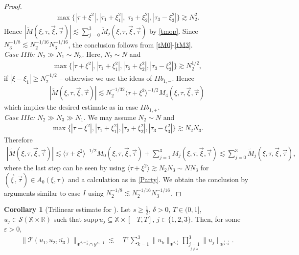 \documentclass[reqno]{amsart}
\theoremstyle{Definitionl}
\theoremstyle{Definitionk}
\theoremstyle{definition}
\theoremstyle{Satzk}
\theoremstyle{Satzl}
\newtheorem{korl}[defi]{Corollary}
\theoremstyle{Bemerkung}
\begin{document}
\begin{proof}
\begin{align*}
\max\{|\tau+\xi^2|,|\tau_1+\xi_1^2|,|\tau_2+\xi_2^2|,|\tau_3-\xi_3^2|\}\gtrsim N_2^2.
\end{align*}
Hence $|\tilde M(\xi,\tau,\vec\xi,\vec\tau)|\lesssim \sum_{j=0}^3\tilde M_j(\xi,\tau,\vec\xi,\vec\tau)$ by \eqref{tmop}. Since $N_3^{-1/8}\lesssim N_2^{-1/16}N_3^{-1/16}$, the conclusion follows from \eqref{tM0}-\eqref{tM3}.\\[10pt]
\emph{Case $IIIb$: $N_2\gg N_1\sim N_3$. }Here, $N_2\sim N$ and 
\begin{align*}
\max\{|\tau+\xi^2|,|\tau_1+\xi_1^2|,|\tau_2+\xi_2^2|,|\tau_3-\xi_3^2|\}\gtrsim N_2^{1/2},
\end{align*}
if $|\xi-\xi_1|\ge N_2^{-1/2}$ -- otherwise we use the ideas of $IIb_{1,-}$. Hence
\begin{align*}
|\tilde M(\xi,\tau,\vec\xi,\vec\tau)|\lesssim N_2^{-1/32}\langle\tau+\xi^2\rangle^{-1/2}M_4(\xi,\tau,\vec\xi,\vec\tau)
\end{align*}
which implies the desired estimate as in case $IIb_{1,+}$.\\[10pt]
\emph{Case $IIIc$: $N_2\gg N_3\gg N_1$. }We may assume $N_2\sim N$ and 
\begin{align*}
\max\{|\tau+\xi^2|,|\tau_1+\xi_1^2|,|\tau_2+\xi_2^2|,|\tau_3-\xi_3^2|\}\gtrsim N_2N_3.
\end{align*}
Therefore
\begin{align*}
|\tilde M(\xi,\tau,\vec\xi,\vec\tau)|
\lesssim \langle\tau+\xi^2\rangle^{-1/2}M_0(\xi,\tau,\vec\xi,\vec\tau)+\sum_{j=1}^3M_j(\xi,\tau,\vec\xi,\vec\tau)
\lesssim \sum_{j=0}^3\tilde M_j(\xi,\tau,\vec\xi,\vec\tau),
\end{align*}
where the last step can be seen by using $\langle\tau+\xi^2\rangle\gtrsim N_2N_3\sim NN_3$ for $(\vec\xi,\vec\tau)\in A_0(\xi,\tau)$ and a calculation as in \eqref{Party}. We obtain the conclusion by arguments similar to case $I$ using $N_2^{-1/8}\lesssim N_2^{-1/16}N_3^{-1/16}$.
\end{proof}
\begin{korl}[Trilinear estimate for \unboldmath{}]\label{kor}
Let $s\ge\frac12$, $\delta>0$, $T\in(0,1]$, $u_j\in\mathcal S(\mathbb X\times\mathbb R)$ such that $\mathrm{supp}\,u_j\subseteq\mathbb X\times[-T,T]$, $j\in\{1,2,3\}$. Then, for some $\varepsilon>0$,
\begin{align*}
\|\mathcal T(u_1,u_2,\overline{u_3})\|_{\mathfrak X^{s,-\frac12}\cap\mathcal Y^{s,-1}}\lesssim&\, T^\varepsilon\sum_{k=1}^3\|u_k\|_{\mathfrak X^{s,\frac12}}\prod_{\underset{j\ne k}{j=1}}^3\|u_j\|_{\mathfrak X^{\frac12,\frac12}}.
\end{align*}
\end{korl}
\end{document}
